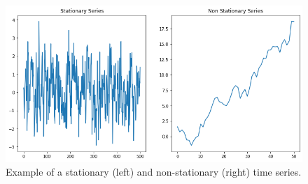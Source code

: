 %
%
%    

\begin{figure}[htb]
	\centering
	\includegraphics[width=0.7\linewidth]{figures/stationary_and_non_stationary.png}
	\caption{Example of a stationary (left) and non-stationary (right) time series.}
	\label{fig:stationary_non_stationary}
\end{figure}
        
